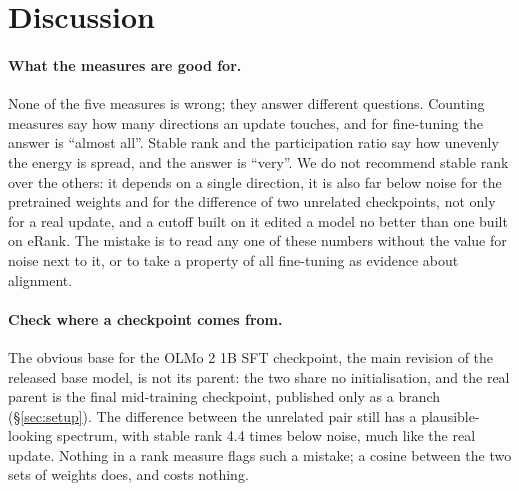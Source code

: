 \section{Discussion}
\label{sec:discussion}

\paragraph{What the measures are good for.} None of the five measures is
wrong; they answer different questions. Counting measures say how many
directions an update touches, and for fine-tuning the answer is ``almost
all''. Stable rank and the participation ratio say how unevenly the energy is
spread, and the answer is ``very''. We do not recommend stable rank over the
others: it depends on a single direction, it is also far below noise for the
pretrained weights and for the difference of two unrelated checkpoints, not
only for a real update, and a cutoff built on it edited a model no better than
one built on eRank. The mistake is to read any one of these numbers without the value for
noise next to it, or to take a property of all fine-tuning as evidence about
alignment.

\paragraph{Check where a checkpoint comes from.} The obvious base for the
OLMo 2 1B SFT checkpoint, the main revision of the released base model, is not
its parent: the two share no initialisation, and the real parent is the final
mid-training checkpoint, published only as a branch (\S\ref{sec:setup}). The
difference between the unrelated pair still has a plausible-looking spectrum,
with stable rank 4.4 times below noise, much like the real update. Nothing in
a rank measure flags such a mistake; a cosine between the two sets of weights
does, and costs nothing.

